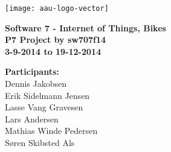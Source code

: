 \thispagestyle{empty} %

\hspace*{-1cm}\parbox[b][\textheight][t]{\textwidth}
{

\begin{center}
	\texttt{[image: aau-logo-vector]}\\
	\vspace{0.25cm}
\end{center} 

\vspace{1cm}
\begin{center}

\textbf{\Huge {Software 7 - Internet of Things, Bikes}} \\ \vspace{0.5cm}
\textbf{\Large P7 Project by sw707f14}\\ \vspace{0.5cm}
\textbf{\large 3-9-2014 to 19-12-2014}\\
\end{center}



\vspace{0.25cm}
\begin{center}
\item {\textbf{Participants:}} \\
Dennis Jakobsen\\ Erik Sidelmann Jensen\\ Lasse Vang Gravesen\\ Lars Andersen\\ Mathias Winde Pedersen\\ Søren Skibsted Als\\
\end{center}

\thispagestyle{empty}

\newpage
\thispagestyle{empty}
\mbox{}
}